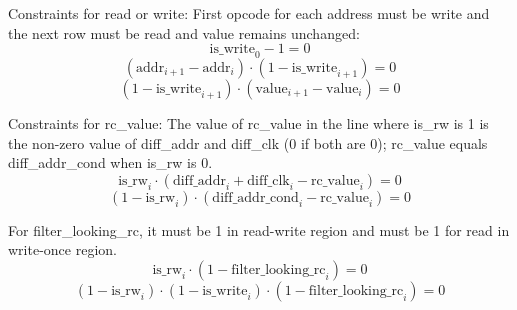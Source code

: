 Constraints for read or write: First opcode for each address must be write and the next row must be read and value remains unchanged:
\[ \mathrm{is\_write}_0-1=0 \]
\[ (\mathrm{addr}_{i+1}-\mathrm{addr}_i) \cdot (1-\mathrm{is\_write}_{i+1})=0 \]
\[ (1-\mathrm{is\_write}_{i+1}) \cdot (\mathrm{value}_{i+1}-\mathrm{value}_i)=0 \]

Constraints for rc\_value:
The value of rc\_value in the line where is\_rw is 1 is the non-zero value of diff\_addr and diff\_clk (0 if both are 0); rc\_value equals diff\_addr\_cond when is\_rw is 0.
\[ \mathrm{is\_rw}_i \cdot (\mathrm{diff\_addr}_i + \mathrm{diff\_clk}_i - \mathrm{rc\_value}_i)=0 \]
\[ (1-\mathrm{is\_rw}_i) \cdot (\mathrm{diff\_addr\_cond}_i - \mathrm{rc\_value}_i)=0 \]

For filter\_looking\_rc, it must be 1 in read-write region and must be 1 for read in write-once region.
\[ \mathrm{is\_rw}_i \cdot (1-\mathrm{filter\_looking\_rc}_i)=0 \]
\[ (1-\mathrm{is\_rw}_i) \cdot (1-\mathrm{is\_write}_i) \cdot (1-\mathrm{filter\_looking\_rc}_i)=0 \]
